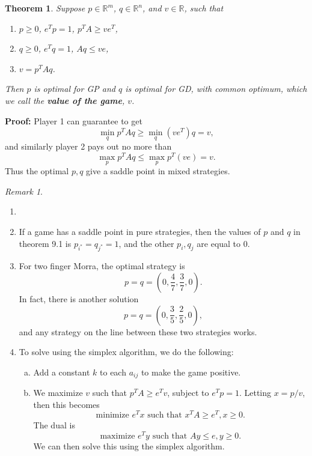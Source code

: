 \documentclass[12pt]{article}
\newtheorem{theorem}{Theorem}[section]
\theoremstyle{definition}
\theoremstyle{remark}
\newtheorem*{remark}{Remark}
\begin{document}
\begin{theorem}
	Suppose $p \in \mathbb{R}^{m}$, $q \in \mathbb{R}^{n}$, and $v \in \mathbb{R}$, such that
	\begin{enumerate}[\normalfont(a)]
		\item $p \geq 0$, $e^{T}p = 1$, $p^{T}A \geq ve^{T}$,
		\item $q \geq 0$, $e^{T}q = 1$, $Aq \leq ve$,
		\item $v = p^{T}Aq$.
	\end{enumerate}
	Then $p$ is optimal for GP and $q$ is optimal for GD, with common optimum, which we call the \textbf{value of the game}, $v$.
\end{theorem}

\begin{adjustbox}{minipage = \columnwidth - 25.5pt, margin=1em, frame=1pt, margin=0em}
\textbf{Proof:} Player 1 can guarantee to get
\[
	\min_{q} p^{T}Aq \geq \min_{q} (ve^{T})q = v
,\]
and similarly player 2 pays out no more than
\[
	\max_{p} p^{T}Aq \leq \max_{p} p^{T}(ve) = v
.\]
Thus the optimal $p, q$ give a saddle point in mixed strategies.
\end{adjustbox}

\begin{remark}
	\begin{enumerate}[1.]
		\item[]
		\item If a game has a saddle point in pure strategies, then the values of $p$ and $q$ in theorem 9.1 is $p_{i^{\ast}} = q_{j^{\ast}} = 1$, and the other $p_i, q_j$ are equal to $0$.
		\item For two finger Morra, the optimal strategy is
			\[
				p = q = \left(0, \frac{4}{7}, \frac{3}{7}, 0\right)
			.\]
			In fact, there is another solution
			\[
				p = q = \left(0, \frac{3}{5}, \frac{2}{5}, 0 \right)
			,\]
			and any strategy on the line between these two strategies works.
		\item To solve using the simplex algorithm, we  do the following:
			\begin{enumerate}[(a)]
				\item Add a constant $k$ to each $a_{ij}$ to make the game positive.
				\item We maximize $v$ such that $p^{T}A \geq e^{T}v$, subject to $e^{T}p = 1$. Letting $x = p/v$, then this becomes
					\[
						\text{minimize } e^{T}x \text{ such that } x^{T}A \geq e^{T}, x \geq 0
					.\]
					The dual is
					\[
						\text{maximize } e^{T}y \text{ such that } Ay \leq e, y \geq 0
					.\]
					We can then solve this using the simplex algorithm.
			\end{enumerate}
	\end{enumerate}
\end{remark}
\end{document}
